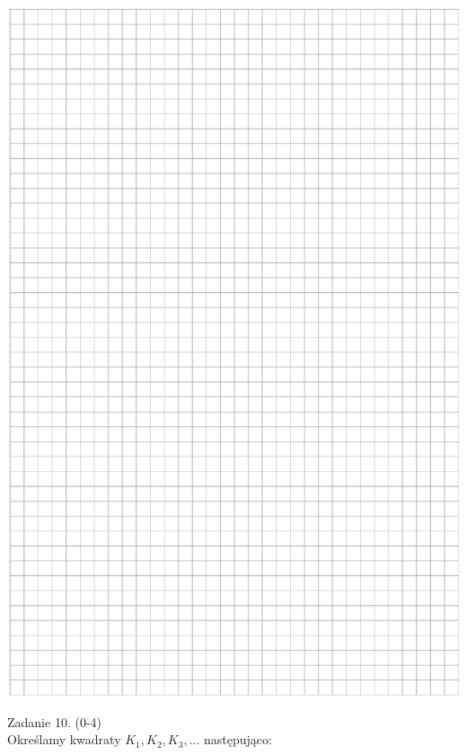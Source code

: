 \documentclass[10pt]{article}
\begin{document}
\begin{center}
\includegraphics[max width=\textwidth]{2024_11_21_f1ecc00f5c4ab21f0d04g-15}
\end{center}

Zadanie 10. (0-4)\\
Określamy kwadraty \(K_{1}, K_{2}, K_{3}, \ldots\) następująco:
\end{document}
